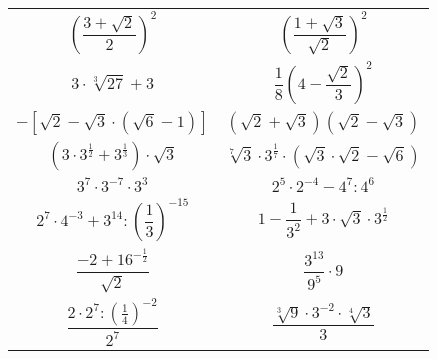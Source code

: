 \documentclass[a4paper,12pt,leqno,fleqn]{article}
\begin{document}
\begin{tabularx}{\linewidth}{@{}XX@{}}

  \begin{equation}
    \left(\frac{3+\sqrt{2}}{2}\right)^2
  \end{equation}
&
  \begin{equation}
    \left(\frac{1+\sqrt{3}}{\sqrt{2}}\right)^2
  \end{equation}
\\
  \begin{equation}
    3\cdot\sqrt[3]{27}+3
  \end{equation}
&
  \begin{equation}
    \frac{1}{8}\left(4-\frac{\sqrt{2}}{3}\right)^2
  \end{equation}
\\
  \begin{equation}
    -\left[\sqrt{2}-\sqrt{3}\cdot(\sqrt{6}-1)\right]
  \end{equation}
&
  \begin{equation}
    (\sqrt{2}+\sqrt{3})(\sqrt{2}-\sqrt{3})
  \end{equation}
\\
  \begin{equation}
    \left(3\cdot3^{\frac{1}{2}}+3^{\frac{1}{3}}\right)\cdot\sqrt{3}
  \end{equation}
&
  \begin{equation}
    \sqrt[7]{3}\cdot3^{\frac{1}{7}}\cdot\left(\sqrt{3}\cdot\sqrt{2}-\sqrt{6}\right)
  \end{equation}
\\
  \begin{equation}
    3^7\cdot3^{-7}\cdot3^3
  \end{equation}
&
  \begin{equation}
    2^5\cdot2^{-4}-4^7:4^6
  \end{equation}
\\
  \begin{equation}
    2^7\cdot4^{-3}+3^{14}:\left(\frac{1}{3}\right)^{-15}
  \end{equation}
&
  \begin{equation}
    1-\frac{1}{3^{2}}+3\cdot\sqrt{3}\cdot3^{\frac{1}{2}}
  \end{equation}
\\
  \begin{equation}
    \frac{-2+16^{-\frac{1}{2}}}{\sqrt{2}}
  \end{equation}
&
  \begin{equation}
    \frac{3^{13}}{9^{5}}\cdot9
  \end{equation}
\\
  \begin{equation}
    \frac{2\cdot2^{7}:\left(\frac{1}{4}\right)^{-2}}{2^{7}}
  \end{equation}
&
  \begin{equation}
    \frac{\sqrt[3]{9}\cdot3^{-2}\cdot{\sqrt[4]{3}}}{3}
  \end{equation}

\end{tabularx}
\end{document}
